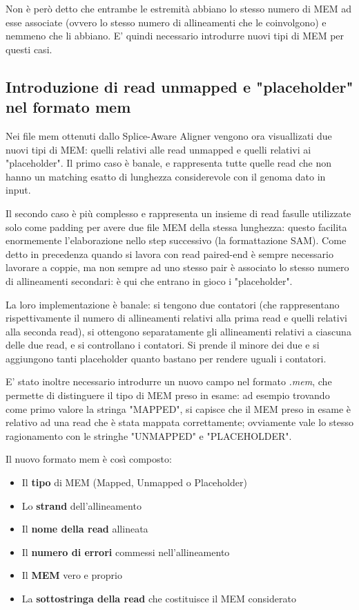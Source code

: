Non è però detto che entrambe le estremità abbiano lo stesso numero di MEM ad esse associate (ovvero lo stesso numero di allineamenti che le coinvolgono) e nemmeno che li abbiano. E' quindi necessario introdurre nuovi tipi di MEM per questi casi.


\subsection{Introduzione di read unmapped e "placeholder" nel formato mem}
Nei file mem ottenuti dallo Splice-Aware Aligner vengono ora visuallizati due nuovi tipi di MEM: quelli relativi alle read unmapped e quelli relativi ai "placeholder". Il primo caso è banale, e rappresenta tutte quelle read che non hanno un matching esatto di lunghezza considerevole con il genoma dato in input.

Il secondo caso è più complesso e rappresenta un insieme di read fasulle utilizzate solo come padding per avere due file MEM della stessa lunghezza: questo facilita enormemente l'elaborazione nello step successivo (la formattazione SAM). Come detto in precedenza quando si lavora con read paired-end è sempre necessario lavorare a coppie, ma non sempre ad uno stesso pair è associato lo stesso numero di allineamenti secondari: è qui che entrano in gioco i "placeholder". 

La loro implementazione è banale: si tengono due contatori (che rappresentano rispettivamente il numero di allineamenti relativi alla prima read e quelli relativi alla seconda read), si ottengono separatamente gli allineamenti relativi a ciascuna delle due read, e si controllano i contatori. Si prende il minore dei due e si aggiungono tanti placeholder quanto bastano per rendere uguali i contatori.

E' stato inoltre necessario introdurre un nuovo campo nel formato \textit{.mem}, che permette di distinguere il tipo di MEM preso in esame: ad esempio trovando come primo valore la stringa "MAPPED", si capisce che il MEM preso in esame è relativo ad una read che è stata mappata correttamente; ovviamente vale lo stesso ragionamento con le stringhe "UNMAPPED" e "PLACEHOLDER".

\newpage

Il nuovo formato mem è così composto:

\begin{itemize}
	\item Il \textbf{tipo} di MEM (Mapped, Unmapped o Placeholder)
	\item Lo \textbf{strand} dell'allineamento
	\item	Il \textbf{nome della read} allineata
	\item Il \textbf{numero di errori} commessi nell'allineamento 
	\item Il \textbf{MEM} vero e proprio
	\item La \textbf{sottostringa della read} che costituisce il MEM considerato
\end{itemize}

